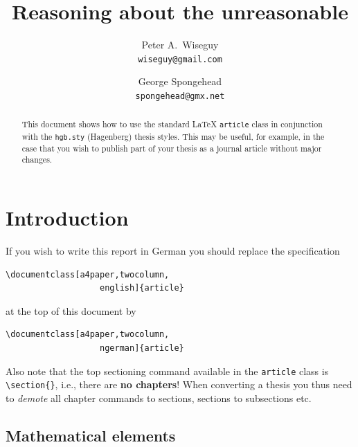 \documentclass[a4paper,twocolumn,english,11pt]{article}
\author{
Peter A.\ Wiseguy\\ 
\texttt{wiseguy@gmail.com}
\and
George Spongehead\\
\texttt{spongehead@gmx.net}}
\title{Reasoning about the unreasonable}
\date{}
\begin{document}
\maketitle

\begin{abstract}
This document shows how to use the standard LaTeX \texttt{article} class in conjunction with the \texttt{hgb.sty}
(Hagenberg) thesis styles. This may be useful, for example, in the case that you wish to publish
part of your thesis as a journal article without major changes.
\end{abstract}


\section{Introduction}

If you wish to write this report in German
you should replace the specification
\begin{verbatim}
\documentclass[a4paper,twocolumn,
                   english]{article}
\end{verbatim}
at the top of this document by
\begin{verbatim}
\documentclass[a4paper,twocolumn,
                   ngerman]{article}
\end{verbatim}
%
Also note that the top sectioning command available in the \texttt{article} class
is \verb!\section{}!, i.e., there are \textbf{no chapters}!
When converting a thesis you thus need to \emph{demote} all chapter commands to
sections, sections to subsections etc.

\subsection{Mathematical elements}
\end{document}
